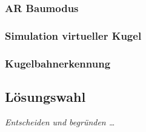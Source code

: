 \subsubsection{AR Baumodus}

\subsubsection{Simulation virtueller Kugel}

\subsubsection{Kugelbahnerkennung}

\subsection{Lösungswahl}
\textit{Entscheiden und begründen …}
